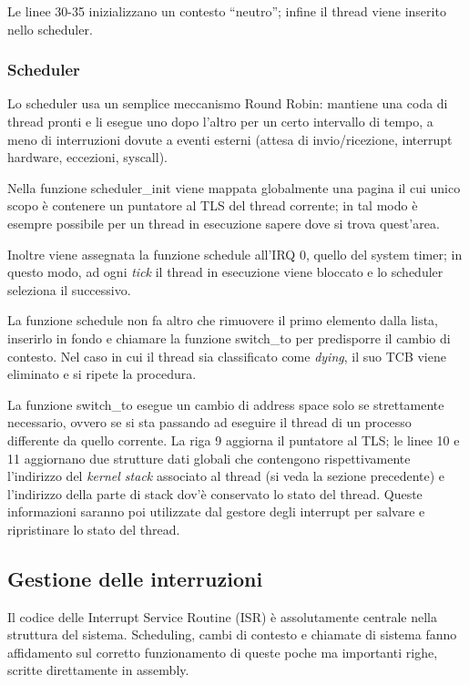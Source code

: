 \documentclass[12pt,a4paper]{report}
\newcommand{\vir}[1]{``#1''}
\begin{document}
				Le linee 30-35 inizializzano un contesto \vir{neutro}; infine il thread viene inserito nello
				scheduler.
				
			\subsubsection{Scheduler}
				Lo scheduler usa un semplice meccanismo Round Robin: mantiene una coda di thread
				pronti e li esegue uno dopo l'altro per un certo intervallo di tempo, a meno di interruzioni
				dovute a eventi esterni (attesa di invio/ricezione, interrupt hardware, eccezioni, syscall).
				
				
				
				Nella funzione scheduler\_init viene mappata globalmente una pagina il cui unico scopo è
				contenere un puntatore al TLS del thread corrente; in tal modo è esempre possibile per
				un thread in esecuzione sapere dove si trova quest'area.
				
				Inoltre viene assegnata la funzione schedule all'IRQ 0, quello del system timer; in questo modo,
				ad ogni \emph{tick} il thread in esecuzione viene bloccato e lo scheduler seleziona il successivo.
				
				La funzione schedule non fa altro che rimuovere il primo elemento dalla lista, inserirlo in fondo
				e chiamare la funzione switch_to per predisporre il cambio di contesto.
				Nel caso in cui il thread sia classificato come \emph{dying}, il suo TCB viene eliminato e si
				ripete la procedura.
				
				La funzione switch\_to esegue un cambio di address space solo se strettamente necessario,
				ovvero se si sta passando ad eseguire il thread di un processo differente da quello corrente.
				La riga 9 aggiorna il puntatore al TLS; le linee 10 e 11 aggiornano due strutture dati globali
				che contengono rispettivamente l'indirizzo del \emph{kernel stack} associato al thread (si veda
				la sezione precedente) e l'indirizzo della parte di stack dov'è conservato lo stato del thread.
				Queste informazioni saranno poi utilizzate dal gestore degli interrupt per salvare e ripristinare
				lo stato del thread.
					
		\subsection{Gestione delle interruzioni}
			Il codice delle Interrupt Service Routine (ISR) è assolutamente centrale nella struttura del sistema.
			Scheduling, cambi di contesto e chiamate di sistema fanno affidamento sul corretto funzionamento
			di queste poche ma importanti righe, scritte direttamente in assembly.
			
\end{document}

